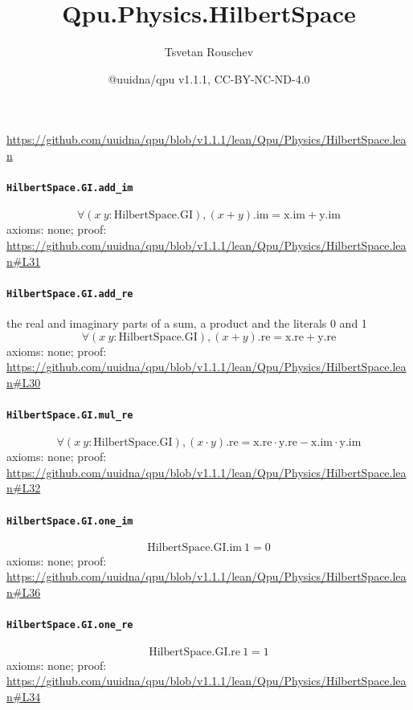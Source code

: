 \documentclass[11pt]{article}
\title{Qpu.Physics.HilbertSpace}
\author{Tsvetan Rouschev}
\date{@uuidna/qpu v1.1.1, CC-BY-NC-ND-4.0}
\begin{document}
\maketitle
\noindent\url{https://github.com/uuidna/qpu/blob/v1.1.1/lean/Qpu/Physics/HilbertSpace.lean}

\paragraph{\texttt{HilbertSpace.GI.add\_im}}
\[ \forall (x\ y : \mathrm{HilbertSpace.GI}), (x + y)\mathrm{.im} = \mathrm{x.im} + \mathrm{y.im} \]
\noindent axioms: none; proof: \url{https://github.com/uuidna/qpu/blob/v1.1.1/lean/Qpu/Physics/HilbertSpace.lean\#L31}

\paragraph{\texttt{HilbertSpace.GI.add\_re}}
the real and imaginary parts of a sum, a product and the literals 0 and 1
\[ \forall (x\ y : \mathrm{HilbertSpace.GI}), (x + y)\mathrm{.re} = \mathrm{x.re} + \mathrm{y.re} \]
\noindent axioms: none; proof: \url{https://github.com/uuidna/qpu/blob/v1.1.1/lean/Qpu/Physics/HilbertSpace.lean\#L30}

\paragraph{\texttt{HilbertSpace.GI.mul\_re}}
\[ \forall (x\ y : \mathrm{HilbertSpace.GI}), (x \cdot y)\mathrm{.re} = \mathrm{x.re} \cdot \mathrm{y.re} - \mathrm{x.im} \cdot \mathrm{y.im} \]
\noindent axioms: none; proof: \url{https://github.com/uuidna/qpu/blob/v1.1.1/lean/Qpu/Physics/HilbertSpace.lean\#L32}

\paragraph{\texttt{HilbertSpace.GI.one\_im}}
\[ \mathrm{HilbertSpace.GI.im}\ 1 = 0 \]
\noindent axioms: none; proof: \url{https://github.com/uuidna/qpu/blob/v1.1.1/lean/Qpu/Physics/HilbertSpace.lean\#L36}

\paragraph{\texttt{HilbertSpace.GI.one\_re}}
\[ \mathrm{HilbertSpace.GI.re}\ 1 = 1 \]
\noindent axioms: none; proof: \url{https://github.com/uuidna/qpu/blob/v1.1.1/lean/Qpu/Physics/HilbertSpace.lean\#L34}
\end{document}
